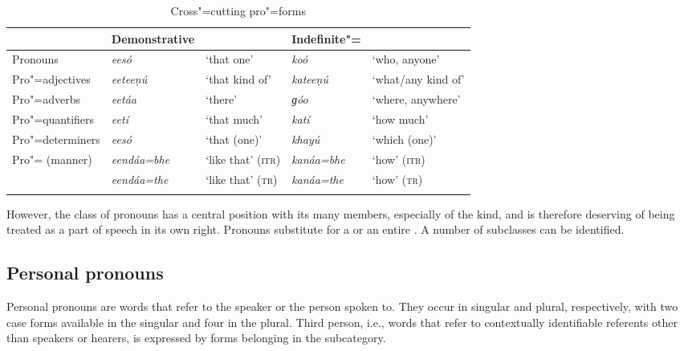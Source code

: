 \begin{table}[ht]
\caption{Cross"=cutting pro"=forms}
\begin{tabularx}{\textwidth}{ Q Q Q Q Q }
\lsptoprule
&
Demonstrative &
&
Indefinite"= &
\\\midrule
Pronouns &
\textit{eesó} &
`that one' &
\textit{koó} &
`who, anyone'\\
Pro"=adjectives &
\textit{eeteeṇú} &
`that kind of' &
\textit{kateeṇú} &
`what/any kind of' \\
Pro"=adverbs &
\textit{eetáa} &
`there' &
\textit{ɡóo} &
`where, anywhere' \\
Pro"=quantifiers &
\textit{eetí} &
`that much' &
\textit{katí} &
`how much' \\
Pro"=determiners &
\textit{eesó} &
`that (one)' &
\textit{khayú} &
`which (one)' \\
Pro"= (manner) &
\textit{eendáa=bhe} &
`like that' (\textsc{itr}) &
\textit{kanáa=bhe} &
`how' (\textsc{itr}) \\
&
\textit{eendáa=the} &
`like that' (\textsc{tr}) &
\textit{kanáa=the} &
`how' (\textsc{tr}) \\\lspbottomrule
\end{tabularx}
\label{tab:3b-1}
\end{table}


However, the class of pronouns has a central position with its many members, especially of the  kind, and is therefore deserving of being treated as a part of speech in its own right. Pronouns substitute for a  or an entire  . A number of subclasses can be identified.


\subsection{Personal pronouns}
\label{subsec:3b-6-1}
Personal pronouns are words that refer to the speaker or the person spoken to. They occur in singular and plural, respectively, with two case forms available in the singular and four in the plural. Third person, i.e., words that refer to contextually identifiable referents other than speakers or hearers, is expressed by forms belonging in the  subcategory.


